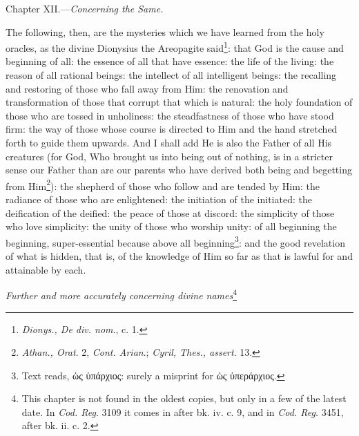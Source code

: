 
Chapter XII.—\emph{Concerning the Same.}

The following, then, are the mysteries which we have learned from the holy oracles, as the divine Dionysius the Areopagite said\footnote{\emph{Dionys., De div. nom}., c. 1.}: that God is the cause and beginning of all: the essence of all that have essence: the life of the living: the reason of all rational beings: the intellect of all intelligent beings: the recalling and restoring of those who fall away from Him: the renovation and transformation of those that corrupt that which is natural: the holy foundation of those who are tossed in unholiness: the steadfastness of those who have stood firm: the way of those whose course is directed to Him and the hand stretched forth to guide them upwards. And I shall add He is also the Father of all His creatures (for God, Who brought us into being out of nothing, is in a stricter sense our Father than are our parents who have derived both being and begetting from Him\footnote{\emph{Athan., Orat}. 2, \emph{Cont. Arian}.; \emph{Cyril, Thes., assert}. 13.}): the shepherd of those who follow and are tended by Him: the radiance of those who are enlightened: the initiation of the initiated: the deification of the deified: the peace of those at discord: the simplicity of those who love simplicity: the unity of those who worship unity: of all beginning the beginning, super-essential because above all beginning\footnote{Text reads, \textgreek{ὡς ὑπάρχιος}: surely a misprint for \textgreek{ὡς ὑπεράρχιος}.}: and the good revelation of what is hidden, that is, of the knowledge of Him so far as that is lawful for and attainable by each.

\emph{Further and more accurately concerning divine names}\footnote{This chapter is not found in the oldest copies, but only in a few of the latest date. In \emph{Cod. Reg}. 3109 it comes in after bk. iv. c. 9, and in \emph{Cod. Reg. }3451, after bk. ii. c. 2.}


